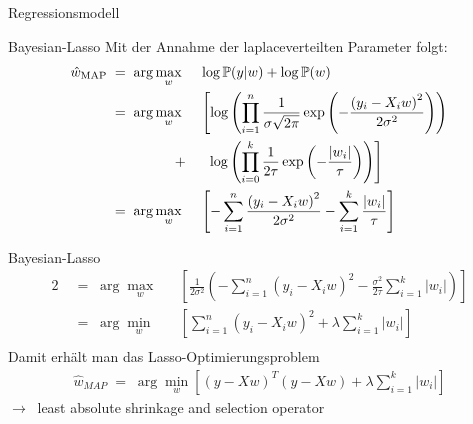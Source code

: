 \documentclass{beamer}
\begin{document}
{\begin{frame}{Regressionsmodell}
\end{frame}

\begin{frame}{Bayesian-Lasso}
	Mit der Annahme der laplaceverteilten Parameter folgt:
	\begin{alignat}{2}
		\hat{w}_{\text{MAP}}&\;=\;\arg\underset{w}{\max}&& \log\mathbb{P}(y\vert w) + \log \mathbb{P}(w) \\
		&\;=\;\arg\underset{w}{\max}&&\left[\log\left(\prod_{i=1}^{n}\frac{1}{\sigma\sqrt{2\pi}}\exp\left(-\frac{\left(y_i-X_iw\right)^2}{2\sigma^2}\right)\right)\right.\\	&\hspace{1,7cm}+&&\:\:\left.\log\left(\prod_{i=0}^{k}\frac{1}{2\tau}\exp\left(-\frac{\left|w_i\right|}{\tau}\right)\right)\right]\\
		&\;=\;\arg\underset{w}{\max} && \left[-\sum_{i=1}^{n}\frac{\left(y_i-X_iw\right)^2}{2\sigma^2}-\sum_{i=1}^{k}\frac{\left|w_i\right|}{\tau}\right]\\
	\end{alignat}
\end{frame}

\begin{frame}{Bayesian-Lasso}
	\begin{alignat}{2}
		&\;=\;\arg\underset{w}{\max} && \left[\frac{1}{2\sigma^2}\left(-\sum_{i=1}^{n}\left(y_i-X_iw\right)^2-\frac{\sigma^2}{2\tau}\sum_{i=1}^{k}\left|w_i\right|\right)\right]\\
		&\;=\;\arg\underset{w}{\min} && \left[\sum_{i=1}^{n}\left(y_i-X_iw\right)^2+\lambda\sum_{i=1}^{k}\left|w_i\right|\right] \\
	\end{alignat}
	Damit erhält man das Lasso-Optimierungsproblem
	\begin{align}
		\hat{w}_{MAP}\;=\;\arg\underset{w}{\min}\left[\left(y-Xw\right)^T\left(y-Xw\right)+\lambda\sum_{i=1}^{k}\left|w_i\right|\right]
	\end{align}
	$\rightarrow\:$ least absolute shrinkage and selection operator
\end{frame}

}
\end{document}
